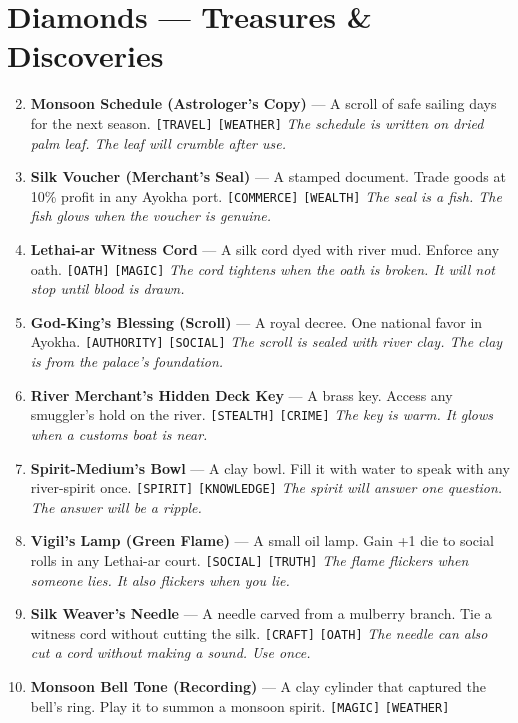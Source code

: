 \section*{Diamonds --- Treasures \& Discoveries}
\label{sec:ayokha-rewards}
\begin{enumerate}
\setcounter{enumi}{1}
\item \textbf{Monsoon Schedule (Astrologer's Copy)} --- A scroll of safe sailing days for the next season. \texttt{[TRAVEL]} \texttt{[WEATHER]}
  \hfill \textit{The schedule is written on dried palm leaf. The leaf will crumble after use.}
\item \textbf{Silk Voucher (Merchant's Seal)} --- A stamped document. Trade goods at 10\% profit in any Ayokha port. \texttt{[COMMERCE]} \texttt{[WEALTH]}
  \hfill \textit{The seal is a fish. The fish glows when the voucher is genuine.}
\item \textbf{Lethai-ar Witness Cord} --- A silk cord dyed with river mud. Enforce any oath. \texttt{[OATH]} \texttt{[MAGIC]}
  \hfill \textit{The cord tightens when the oath is broken. It will not stop until blood is drawn.}
\item \textbf{God-King's Blessing (Scroll)} --- A royal decree. One national favor in Ayokha. \texttt{[AUTHORITY]} \texttt{[SOCIAL]}
  \hfill \textit{The scroll is sealed with river clay. The clay is from the palace's foundation.}
\item \textbf{River Merchant's Hidden Deck Key} --- A brass key. Access any smuggler's hold on the river. \texttt{[STEALTH]} \texttt{[CRIME]}
  \hfill \textit{The key is warm. It glows when a customs boat is near.}
\item \textbf{Spirit-Medium's Bowl} --- A clay bowl. Fill it with water to speak with any river-spirit once. \texttt{[SPIRIT]} \texttt{[KNOWLEDGE]}
  \hfill \textit{The spirit will answer one question. The answer will be a ripple.}
\item \textbf{Vigil's Lamp (Green Flame)} --- A small oil lamp. Gain +1 die to social rolls in any Lethai-ar court. \texttt{[SOCIAL]} \texttt{[TRUTH]}
  \hfill \textit{The flame flickers when someone lies. It also flickers when you lie.}
\item \textbf{Silk Weaver's Needle} --- A needle carved from a mulberry branch. Tie a witness cord without cutting the silk. \texttt{[CRAFT]} \texttt{[OATH]}
  \hfill \textit{The needle can also cut a cord without making a sound. Use once.}
\item \textbf{Monsoon Bell Tone (Recording)} --- A clay cylinder that captured the bell's ring. Play it to summon a monsoon spirit. \texttt{[MAGIC]} \texttt{[WEATHER]}

\end{enumerate}
